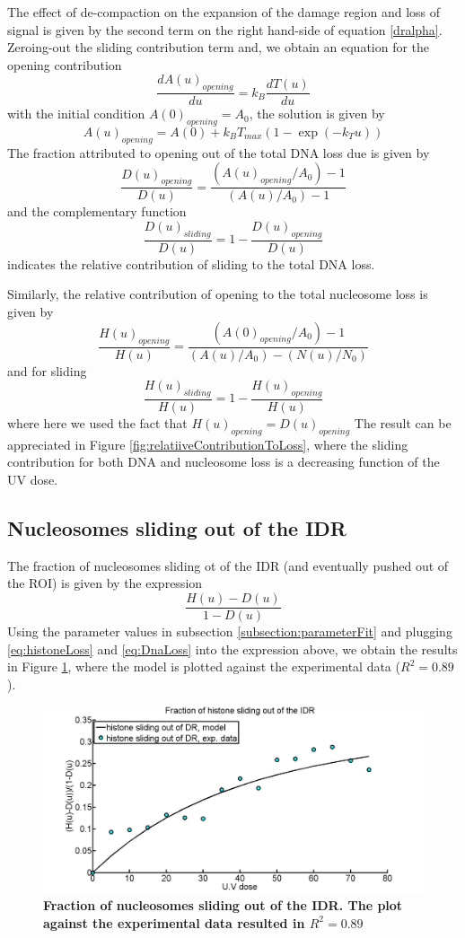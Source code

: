 \documentclass[12pt]{article}
\begin{document}
The effect of de-compaction on the expansion of the damage region and loss of signal is given by the second term on the right hand-side of equation \ref{dralpha}. Zeroing-out the sliding contribution term and,  we obtain an equation for the opening contribution 
\begin{equation*}
\frac{dA(u)_{opening}}{du}=k_B\frac{dT(u)}{du}
\end{equation*}
with the initial condition $A(0)_{opening}=A_0$, the solution is given by
\begin{equation}
A(u)_{opening}= A(0)+k_BT_{max}(1-\exp(-k_Tu))
\end{equation}
The fraction attributed to opening out of the total DNA loss due is given by 
\begin{equation}\label{eq:openingContributionDNA}
\frac{D(u)_{opening}}{D(u)}=\frac{\left(A(u)_{opening}/A_0\right)-1}{\left(A(u)/A_0\right) -1}
\end{equation}
and the complementary function 
\begin{equation}\label{eq:slidingContributionDNA}
\frac{D(u)_{sliding}}{D(u)}=1-\frac{D(u)_{opening}}{D(u)}
\end{equation}
indicates the relative contribution of sliding to the total DNA loss. 

Similarly, the relative contribution of opening to the total nucleosome loss is given by 
\begin{equation}\label{eq:openingContributionHistones}
\frac{H(u)_{opening}}{H(u)} =\frac{\left(A(0)_{opening}/A_0\right)-1}{(A(u)/A_0)-(N(u)/N_0)}
\end{equation}
and for sliding
\begin{equation}\label{eq:slidingContributionHistones}
\frac{H(u)_{sliding}}{H(u)} = 1-\frac{H(u)_{opening}}{H(u)} 
\end{equation}
where here we used the fact that $H(u)_{opening}=D(u)_{opening}$
The result can be appreciated in Figure \ref{fig:relatiiveContributionToLoss}, where the sliding contribution for both DNA and nucleosome loss is a decreasing function of the UV dose. 

\subsection{Nucleosomes sliding out of the IDR}
The fraction of nucleosomes sliding ot of the IDR (and eventually pushed out of the ROI) is given by the expression 
\begin{equation}
\frac{H(u)-D(u)}{1-D(u)}
\end{equation}
Using the parameter values in subsection \ref{subsection:parameterFit} and plugging \ref{eq:histoneLoss} and \ref{eq:DnaLoss} into the expression above, we obtain the results in Figure \ref{fig:fractionSlidingOutOfIDR}, where the model is plotted against the experimental data ($R^2=0.89$). 

\begin{figure}[H]
\centering
\includegraphics[width=0.5\linewidth, height=0.3\textheight]{fractionSlidingOutOfIDR}
\caption{\textbf{Fraction of nucleosomes sliding out of the IDR. The plot against the experimental data resulted in $R^2=0.89$ }}
\label{fig:fractionSlidingOutOfIDR}
\end{figure}
\end{document}
